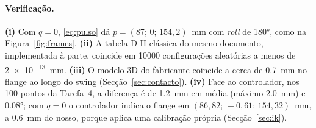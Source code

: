 \paragraph{Verificação.} \textbf{(i)} Com $q=0$, \eqref{eq:pulso} dá
$p = (87;\,0;\,154{,}2)$~mm com \emph{roll} de \ang{180}, como na
Figura~\ref{fig:frames}. \textbf{(ii)} A tabela D-H clássica do mesmo
documento, implementada à parte, coincide em \num{10000} configurações
aleatórias a menos de \SI{2e-13}{\milli\meter}. \textbf{(iii)} O modelo 3D
do fabricante coincide a cerca de \SI{0.7}{\milli\meter} no flange ao longo
do swing (Secção~\ref{sec:contacto}). \textbf{(iv)} Face ao controlador, nos
100 pontos da Tarefa~4, a diferença é de \SI{1.2}{\milli\meter} em média
(máximo \SI{2.0}{\milli\meter}) e \ang{0.08}; com $q=0$ o controlador indica
o flange em $(86{,}82;\,-0{,}61;\,154{,}32)$~mm, a \SI{0.6}{\milli\meter} do
nosso, porque aplica uma calibração própria (Secção~\ref{sec:ik}).
